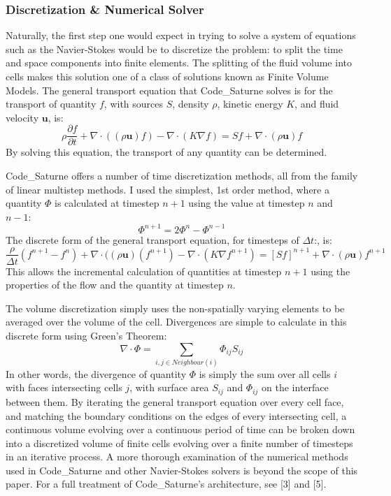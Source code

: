 \documentclass[12pt]{article}
\begin{document}
\subsubsection{Discretization \& Numerical Solver}
Naturally, the first step one would expect in trying to solve a system of
equations such as the Navier-Stokes would be to discretize the problem: to split
the time and space components into finite elements.  The splitting of the fluid
volume into cells makes this solution one of a class of solutions known as 
Finite Volume Models.  The general transport equation that Code\_Saturne solves
is for the transport of quantity $f$, with sources $S$, density $\rho$, 
kinetic energy $K$, and fluid velocity $\mathbf{u}$, is:
$$\rho\frac{\partial f}{\partial t} + \nabla\cdot((\rho\mathbf{u})f) - 
\nabla\cdot (K\nabla f) = Sf+\nabla\cdot(\rho\mathbf{u})f$$
By solving this equation, the transport of any quantity can be determined.

Code\_Saturne offers a number of time discretization methods, all from the 
family of linear multistep methods.  I used the simplest, 1st order method, 
where a quantity $\Phi$ is calculated at timestep $n+1$ using the value at 
timestep $n$ and $n-1$:
$$\Phi^{n+1} = 2\Phi^n-\Phi^{n-1}$$
The discrete form of the general transport equation, for timesteps of 
$\Delta t$:, is:
$$\frac{\rho}{\Delta t}(f^{n+1}-f^n)+\nabla\cdot((\rho\mathbf{u})(f^{n+1})
-\nabla\cdot(K\nabla f^{n+1})=[Sf]^{n+1} + \nabla\cdot(\rho\mathbf{u})f^{n+1}$$
This allows the incremental calculation of quantities at timestep $n+1$ using
the properties of the flow and the quantity at timestep $n$.

The volume discretization simply uses the non-spatially varying elements to be
averaged over the volume of the cell.  Divergences are simple to calculate in
this discrete form using Green's Theorem:
$$\nabla\cdot \Phi = \displaystyle\sum\limits_{i,j \in Neighbour(i)}\Phi_{ij}
S_{ij}$$
In other words, the divergence of quantity $\Phi$ is simply the sum over all
cells $i$ with faces intersecting cells $j$, with surface area $S_{ij}$ and
$\Phi_{ij}$ on the interface between them.  By iterating the general transport
equation over every cell face, and matching the boundary conditions on the 
edges of every intersecting cell, a continuous volume evolving over a continuous
period of time can be broken down into a discretized volume of finite cells
evolving over a finite number of timesteps in an iterative process.  A more 
thorough examination of the numerical methods used in Code\_Saturne and other
Navier-Stokes solvers is beyond the scope of this paper.  For a full treatment
of Code\_Saturne's architecture, see [3] and [5].
\end{document}
